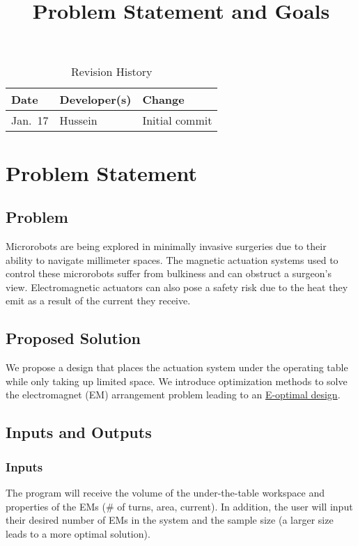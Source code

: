 \documentclass{article}
\title{Problem Statement and Goals\\\progname}
\author{\authname}
\date{}
\begin{document}
\maketitle

\begin{table}[hp]
\caption{Revision History} \label{TblRevisionHistory}
\begin{tabularx}{\textwidth}{llX}
\toprule
\textbf{Date} & \textbf{Developer(s)} & \textbf{Change}\\
\midrule
Jan.~17 & Hussein & Initial commit\\
\bottomrule
\end{tabularx}
\end{table}

\section{Problem Statement}

\subsection{Problem}
Microrobots are being explored in minimally invasive surgeries due to their ability to navigate millimeter spaces. The magnetic actuation systems used to control these microrobots suffer from bulkiness and can obstruct a surgeon's view. Electromagnetic actuators can also pose a safety risk due to the heat they emit as a result of the current they receive. 

\subsection{Proposed Solution}
We propose a design that places the actuation system under the operating table while only taking up limited space. We introduce optimization methods to solve the electromagnet (EM) arrangement problem leading to an \href{https://en.wikipedia.org/wiki/Optimal_experimental_design}{E-optimal design}. 

\subsection{Inputs and Outputs}
\subsubsection{Inputs}
The program will receive the volume of the under-the-table workspace and properties of the EMs (\# of turns, area, current). In addition, the user will input their desired number of EMs in the system and the sample size (a larger size leads to a more optimal solution).
\end{document}
